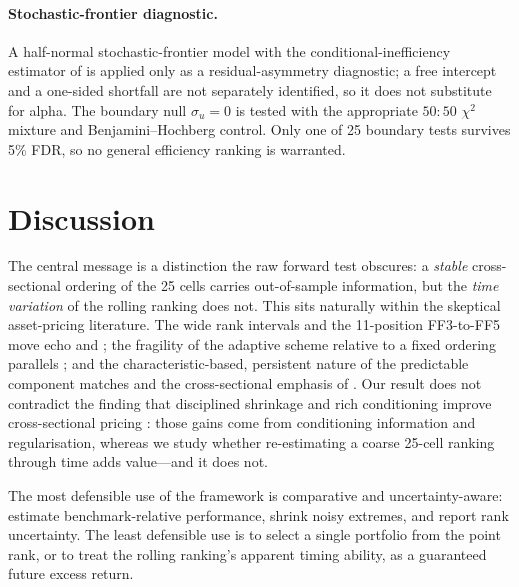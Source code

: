 \documentclass[11pt]{article}
\begin{document}
\paragraph{Stochastic-frontier diagnostic.}
A half-normal stochastic-frontier model \citep{AignerLovellSchmidt1977} with the
conditional-inefficiency estimator of \citet{JondrowLovellMaterovSchmidt1982} is
applied only as a residual-asymmetry diagnostic; a free intercept and a one-sided
shortfall are not separately identified, so it does not substitute for alpha. The
boundary null $\sigma_u=0$ is tested with the appropriate $50{:}50$ $\chi^2$
mixture and Benjamini--Hochberg control. Only one of 25 boundary tests survives
5\% FDR, so no general efficiency ranking is warranted.

\section{Discussion}\label{sec:discussion}
The central message is a distinction the raw forward test obscures: a
\emph{stable} cross-sectional ordering of the 25 cells carries out-of-sample
information, but the \emph{time variation} of the rolling ranking does not. This
sits naturally within the skeptical asset-pricing literature. The wide rank
intervals and the 11-position FF3-to-FF5 move echo \citet{LewellenNagelShanken2010}
and \citet{HarveyLiuZhu2016}; the fragility of the adaptive scheme relative to a
fixed ordering parallels \citet{WelchGoyal2008}; and the characteristic-based,
persistent nature of the predictable component matches \citet{McLeanPontiff2016}
and the cross-sectional emphasis of \citet{Cochrane2011}. Our result does not
contradict the finding that disciplined shrinkage and rich conditioning improve
cross-sectional pricing \citep{KozakNagelSantosh2020,GuKellyXiu2020}: those
gains come from conditioning information and regularisation, whereas we study
whether re-estimating a coarse 25-cell ranking through time adds value---and it
does not.

The most defensible use of the framework is comparative and uncertainty-aware:
estimate benchmark-relative performance, shrink noisy extremes, and report rank
uncertainty. The least defensible use is to select a single portfolio from the
point rank, or to treat the rolling ranking's apparent timing ability, as a
guaranteed future excess return.
\end{document}
